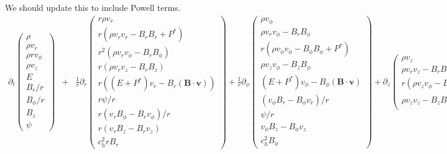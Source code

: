 \documentclass[landscape]{article}
\begin{document}
We should update this to include Powell terms. 
\begin{eqnarray*}
  \partial_t  \left(
  \begin{array}{c}
    \rho\\
    \rho v_r\\
    \rho r v_{\phi}\\
    \rho v_z\\
    E\\
    B_r/r\\
    B_{\phi}/r\\
    B_z\\
    \psi
  \end{array}
  \right) 
  &+& \frac{1}{r} \partial_r \left(
  \begin{array}{c}
    r \rho v_r\\
    r (\rho v_r v_r - B_r B_r + P^*)\\
    r^2 (\rho v_r v_{\phi} - B_r B_{\phi})\\
    r (\rho v_r v_z - B_r B_z)\\
    r((E+P^*)v_r - B_r(\mathbf{B}\cdot\mathbf{v}))\\
    r \psi/r \\
    r(v_r B_{\phi} - B_r v_{\phi})/r\\
    r (v_r B_z - B_r v_z)\\
    c_h^2 r B_r
    \end{array}
  \right) + \frac{1}{r} \partial_{\phi} \left(
    \begin{array}{c}
      \rho v_{\phi}\\
      \rho v_r v_{\phi} - B_r B_{\phi}\\
      r(\rho v_{\phi} v_{\phi} - B_{\phi} B_{\phi} + P^* )\\
      \rho v_z v_{\phi} - B_z B_{\phi}\\
      (E+P^*)v_{\phi}-B_{\phi}(\mathbf{B}\cdot\mathbf{v})\\
      (v_{\phi}B_r-B_{\phi}v_r)/r\\
      \psi/r\\
      v_{\phi}B_z-B_{\phi}v_z\\
      c_h^2 B_{\phi}
    \end{array}
    \right)+ \partial_z \left(
    \begin{array}{c}
      \rho v_z\\
      \rho v_r v_z - B_r B_z\\
      r(\rho v_z v_{\phi} - B_z B_{\phi} )\\
      \rho v_z v_z - B_z B_z + P^*\\

\end{array}
\end{eqnarray*}
\end{document}
